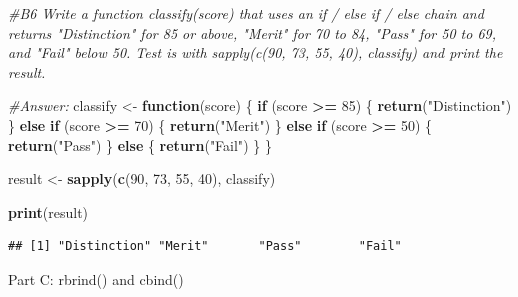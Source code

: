 \documentclass[
]{article}
\newenvironment{Shaded}{\begin{snugshade}}{\end{snugshade}}
\newcommand{\CommentTok}[1]{\textcolor[rgb]{0.56,0.35,0.01}{\textit{#1}}}
\newcommand{\ControlFlowTok}[1]{\textcolor[rgb]{0.13,0.29,0.53}{\textbf{#1}}}
\newcommand{\DecValTok}[1]{\textcolor[rgb]{0.00,0.00,0.81}{#1}}
\newcommand{\FunctionTok}[1]{\textcolor[rgb]{0.13,0.29,0.53}{\textbf{#1}}}
\newcommand{\NormalTok}[1]{#1}
\newcommand{\OtherTok}[1]{\textcolor[rgb]{0.56,0.35,0.01}{#1}}
\newcommand{\SpecialCharTok}[1]{\textcolor[rgb]{0.81,0.36,0.00}{\textbf{#1}}}
\newcommand{\StringTok}[1]{\textcolor[rgb]{0.31,0.60,0.02}{#1}}
\begin{document}
\begin{Shaded}
\begin{Highlighting}[]
\CommentTok{\#B6 Write a function classify(score) that uses an if / else if / else chain and returns "Distinction" for 85 or above, "Merit" for 70 to 84, "Pass" for 50 to 69, and "Fail" below 50. Test is with sapply(c(90, 73, 55, 40), classify) and print the result.}

\CommentTok{\#Answer:}
\NormalTok{classify }\OtherTok{\textless{}{-}} \ControlFlowTok{function}\NormalTok{(score) \{}
  \ControlFlowTok{if}\NormalTok{ (score }\SpecialCharTok{\textgreater{}=} \DecValTok{85}\NormalTok{) \{}
    \FunctionTok{return}\NormalTok{(}\StringTok{"Distinction"}\NormalTok{)}
\NormalTok{  \} }\ControlFlowTok{else} \ControlFlowTok{if}\NormalTok{ (score }\SpecialCharTok{\textgreater{}=} \DecValTok{70}\NormalTok{) \{}
    \FunctionTok{return}\NormalTok{(}\StringTok{"Merit"}\NormalTok{)}
\NormalTok{  \} }\ControlFlowTok{else} \ControlFlowTok{if}\NormalTok{ (score }\SpecialCharTok{\textgreater{}=} \DecValTok{50}\NormalTok{) \{}
    \FunctionTok{return}\NormalTok{(}\StringTok{"Pass"}\NormalTok{)}
\NormalTok{  \} }\ControlFlowTok{else}\NormalTok{ \{}
    \FunctionTok{return}\NormalTok{(}\StringTok{"Fail"}\NormalTok{)}
\NormalTok{  \}}
\NormalTok{\}}

\NormalTok{result }\OtherTok{\textless{}{-}} \FunctionTok{sapply}\NormalTok{(}\FunctionTok{c}\NormalTok{(}\DecValTok{90}\NormalTok{, }\DecValTok{73}\NormalTok{, }\DecValTok{55}\NormalTok{, }\DecValTok{40}\NormalTok{), classify)}

\FunctionTok{print}\NormalTok{(result)}
\end{Highlighting}
\end{Shaded}

\begin{verbatim}
## [1] "Distinction" "Merit"       "Pass"        "Fail"
\end{verbatim}

Part C: rbrind() and cbind()
\end{document}
